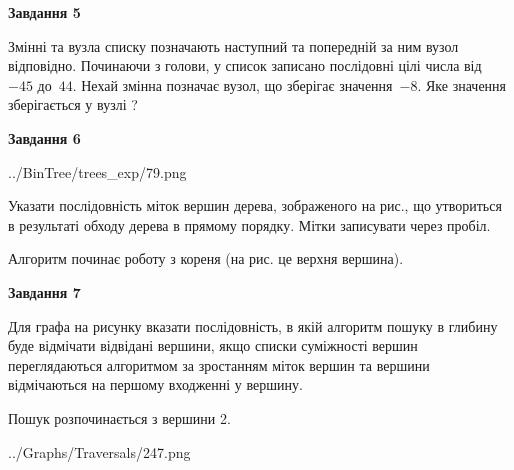 \documentclass[12pt, ukrainian]{article}
\begin{document}
{\begin {large}
{\begin {center}\textbf{Завдання 5}\end {center}}\par
Змінні  та  вузла списку позначають наступний та попередній за ним вузол відповідно. Починаючи з голови, у список записано послідовні цілі числа від~$-45$ до~$44$. Нехай змінна  позначає вузол, що зберігає значення~$-8$.
Яке значення зберігається у вузлі  ?\par
\newpage

{\begin {center}\textbf{Завдання 6}\end {center}}\par

\begin{center}
	{../BinTree/trees_exp/79.png}
\end{center}
Указати послідовність міток вершин дерева, зображеного на рис., що утвориться в результаті обходу дерева в прямому порядку. Мітки записувати через пробіл.\par Алгоритм починає роботу з кореня (на рис. це верхня вершина).\par
\newpage

{\begin {center}\textbf{Завдання 7}\end {center}}\par
Для графа на рисунку вказати послідовність, в якій алгоритм пошуку в глибину буде відмічати відвідані вершини, якщо списки суміжності вершин переглядаються алгоритмом за зростанням міток вершин та вершини відмічаються на першому вход\-женні у вершину.\par
Пошук розпочинається з вершини 2.\par

\begin{center}
	{../Graphs/Traversals/247.png}
\end{center}\par
\newpage


\end{large}}
\end{document}
